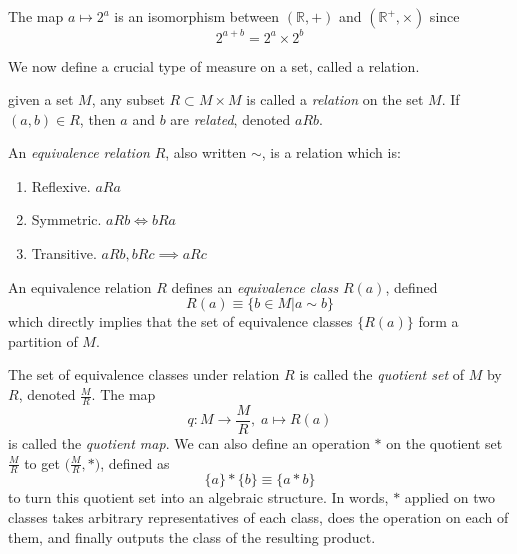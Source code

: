 \documentclass{article}
\begin{document}
    \begin{example}
      The map $a \mapsto 2^{a}$ is an isomorphism between $(\mathbb{R}, +)$ and $(\mathbb{R}^{+}, \times)$ since 
      \begin{equation}
        2^{a+b} = 2^a \times 2^b
      \end{equation}
    \end{example}

    We now define a crucial type of measure on a set, called a relation.  

    \begin{definition}
      given a set $M$, any subset $R \subset M \times M$ is called a \textit{relation} on the set $M$. If $(a, b) \in R$, then $a$ and $b$ are \textit{related}, denoted $a R b$. 
    \end{definition}

    \begin{definition}
      An \textit{equivalence relation} $R$, also written $\sim$, is a relation which is:
      \begin{enumerate}
        \item Reflexive. $a R a$ 
        \item Symmetric. $a R b \iff b R a$ 
        \item Transitive. $a R b, b R c \implies a R c$ 
      \end{enumerate}
      An equivalence relation $R$ defines an \textit{equivalence class} $R(a)$, defined 
      \begin{equation}
        R(a) \equiv \{ b \in M | a\sim b \} 
      \end{equation}
      which directly implies that the set of equivalence classes $\{R(a)\}$ form a partition of $M$. 
    \end{definition}

    \begin{definition}
      The set of equivalence classes under relation $R$ is called the \textit{quotient set} of $M$ by $R$, denoted $\frac{M}{R}$. The map 
      \begin{equation}
        q: M \longrightarrow \frac{M}{R}, \; a \mapsto R(a)
      \end{equation}
      is called the \textit{quotient map}. We can also define an operation $*$ on the quotient set $\frac{M}{R}$ to get $\big( \frac{M}{R}, * \big)$, defined as
      \begin{equation}
        \{a \} * \{ b \} \equiv \{ a * b \}
      \end{equation}
      to turn this quotient set into an algebraic structure. In words, $*$ applied on two classes takes arbitrary representatives of each class, does the operation on each of them, and finally outputs the class of the resulting product. 
    \end{definition}
\end{document}
